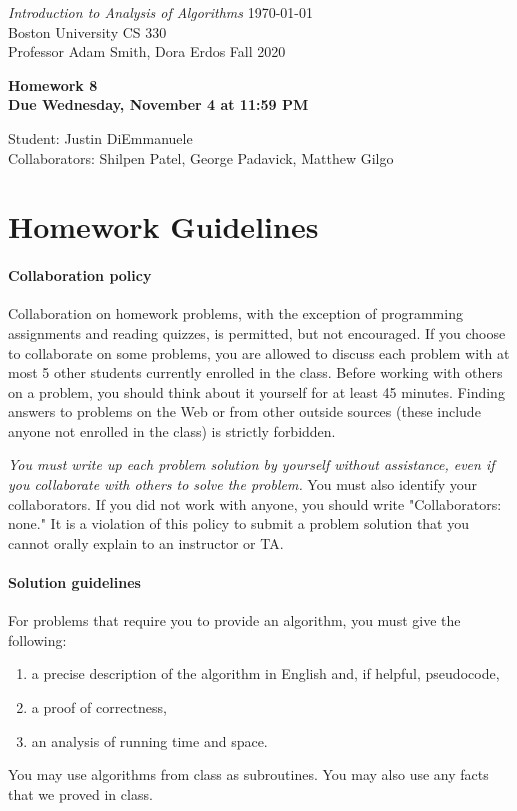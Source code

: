 \documentclass[letterpaper,11pt]{article}
\begin{document}
{\noindent\large
{\em Introduction to Analysis of Algorithms} \hfill \today\\
Boston University \hfill CS 330\\
Professor  Adam Smith, Dora Erdos \hfill Fall 2020\\}
\vspace{1pt}
\hrulefill\vspace{3mm}
\begin{center}
{\LARGE\bf Homework 8}\\
{\bf Due Wednesday, November 4 at 11:59 PM}
\end{center}

\begin{center}
    \color{teal}
   Student: Justin DiEmmanuele \\
    Collaborators: Shilpen Patel, George Padavick, Matthew Gilgo
\end{center}

\section*{Homework Guidelines}

\paragraph{Collaboration policy} Collaboration on homework problems, with the exception of
programming assignments and reading quizzes, is permitted, but not encouraged.
If you
choose to collaborate on some problems, you are allowed to discuss
each problem with at most 5 other students currently enrolled in the
class.
Before working with others on a problem, you should think about it
yourself for at least 45 minutes. Finding answers to problems on the
Web or from other outside sources (these include anyone not enrolled
in the class) is strictly forbidden.

{\em You must write up each problem solution by yourself without
assistance, even if you collaborate with others to solve the
problem.} You must also identify your collaborators. If you did not
work with anyone, you should write "Collaborators: none." It is a
violation of this policy to submit a problem solution that you
cannot orally explain to an instructor or TA.

\paragraph{Solution guidelines} For problems that require you to provide an algorithm, you must give the following:
    \begin{enumerate}
\item  a precise description of the algorithm in English and, if helpful, pseudocode,
\item a proof of correctness,
\item an analysis of running time and space.
\end{enumerate}
You may use algorithms from class as subroutines. You may also use any facts that we proved in class.
\end{document}
